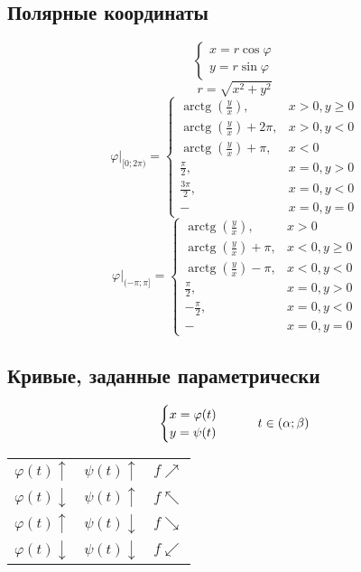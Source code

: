 \documentclass[main]{subfiles}
\begin{document}
    \subsection{Полярные координаты}
    \[\begin{cases}
      x = r\cos\varphi\\
      y = r\sin\varphi
    \end{cases}\]
    \[r = \sqrt{x^2 + y^2}\]
    \[\varphi \Big|_{[0;2\pi)} =
    \begin{cases}
        \operatorname{arctg}(\frac{y}{x}), &  x > 0, y \ge 0\\
        \operatorname{arctg}(\frac{y}{x}) + 2\pi, &  x > 0, y < 0 \\
        \operatorname{arctg}(\frac{y}{x}) + \pi, & x < 0\\
        \frac{\pi}{2}, &  x = 0,  y > 0\\
        \frac{3\pi}{2}, & x = 0,  y < 0\\
        - &  x = 0,  y = 0
    \end{cases}\]
    \[\varphi \Big|_{(-\pi;\pi]} =
    \begin{cases}
        \operatorname{arctg}(\frac{y}{x}), &  x > 0\\
        \operatorname{arctg}(\frac{y}{x}) + \pi, &  x < 0 , y \ge 0\\
        \operatorname{arctg}(\frac{y}{x}) - \pi, & x < 0, y < 0\\
        \frac{\pi}{2}, & x = 0,  y > 0\\
        -\frac{\pi}{2}, & x = 0,  y < 0\\
        - &  x = 0,  y = 0
    \end{cases}\]

    \newpage
    \subsection{Кривые, заданные параметрически}
    \begin{Utv}
        \[\begin{cases}
            x = \varphi(t)\\
            y = \psi(t)
        \end{cases} \qquad t \in (\alpha; \beta)\]

        \begin{tabular}{ccc}
          $\varphi(t) \uparrow$ & $\psi(t) \uparrow$ & $f\nearrow$\\
          $\varphi(t) \downarrow$ & $\psi(t) \uparrow$ & $f\nwarrow$\\
          $\varphi(t) \uparrow$ & $\psi(t) \downarrow$ & $f\searrow$\\
          $\varphi(t) \downarrow$ & $\psi(t) \downarrow$ & $f\swarrow$
        \end{tabular}
    \end{Utv}
\end{document}
